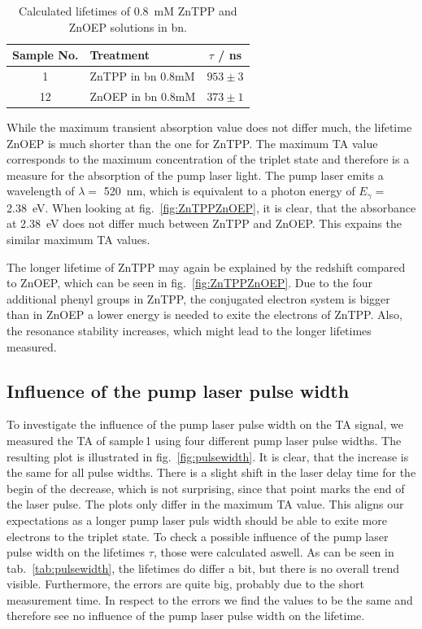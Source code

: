 \begin{table}[ht]
    \centering
    \begin{tabular}{clc}
        \toprule
        Sample No. &    Treatment &    $\tau$ / \si{\nano\second} \\
        \midrule
        1 &     ZnTPP in bn 0.8mM &  $953 \pm 3$ \\
        12 &     ZnOEP in bn 0.8mM &  $373 \pm 1$\\
        \bottomrule
    \end{tabular}
    \caption{Calculated lifetimes of \SI{0.8}{\milli\nauticalmile} ZnTPP and ZnOEP solutions in bn.}
    \label{tab:ZnTPP-ZnOEP}
\end{table}

While the maximum transient absorption value does not differ much, the lifetime ZnOEP is much shorter than the one for ZnTPP. The maximum TA value corresponds to the maximum concentration of the triplet state and therefore is a measure for the absorption of the pump laser light. The pump laser emits a wavelength of $\lambda = $ \SI{520}{\nano\metre}, which is equivalent to a photon energy of $E_{\gamma} = $ \SI{2.38}{\eV}. When looking at fig.~\ref{fig:ZnTPPZnOEP}, it is clear, that the absorbance at \SI{2.38}{\eV} does not differ much between ZnTPP and ZnOEP. This expains the similar maximum TA values. \par 
The longer lifetime of ZnTPP may again be explained by the redshift compared to ZnOEP, which can be seen in fig.~\ref{fig:ZnTPPZnOEP}. Due to the four additional phenyl groups in ZnTPP, the conjugated electron system is bigger than in ZnOEP a lower energy is needed to exite the electrons of ZnTPP. Also, the resonance stability increases, which might lead to the longer lifetimes measured.

\subsection*{Influence of the pump laser pulse width}
To investigate the influence of the pump laser pulse width on the TA signal, we measured the TA of sample\,1 using four different pump laser pulse widths. The resulting plot is illustrated in fig.~\ref{fig:pulsewidth}. It is clear, that the increase is the same for all pulse widths. There is a slight shift in the laser delay time for the begin of the decrease, which is not surprising, since that point marks the end of the laser pulse. The plots only differ in the maximum TA value. This aligns our expectations as a longer pump laser puls width should be able to exite more electrons to the triplet state. To check a possible influence of the pump laser pulse width on the lifetimes $\tau$, those were calculated aswell. As can be seen in tab.~\ref{tab:pulsewidth}, the lifetimes do differ a bit, but there is no overall trend visible. Furthermore, the errors are quite big, probably due to the short measurement time. In respect to the errors we find the values to be the same and therefore see no influence of the pump laser pulse width on the lifetime.

